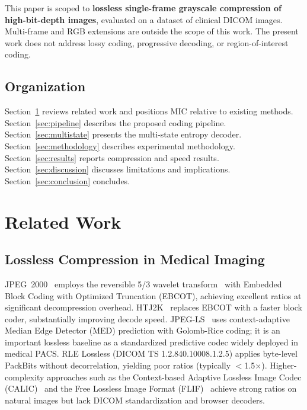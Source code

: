 \documentclass[journal]{IEEEtran}
\begin{document}
This paper is scoped to \textbf{lossless single-frame grayscale compression
of high-bit-depth images}, evaluated on a dataset of clinical DICOM images.
Multi-frame and RGB extensions are outside the scope of this work. The present
work does not address lossy coding, progressive decoding, or
region-of-interest coding.

\subsection{Organization}

Section~\ref{sec:related} reviews related work and positions MIC relative to
existing methods. Section~\ref{sec:pipeline} describes the proposed coding
pipeline. Section~\ref{sec:multistate} presents the multi-state entropy decoder.
Section~\ref{sec:methodology} describes experimental methodology.
Section~\ref{sec:results} reports compression and speed results.
Section~\ref{sec:discussion} discusses limitations and implications.
Section~\ref{sec:conclusion} concludes.

\section{Related Work}
\label{sec:related}

\subsection{Lossless Compression in Medical Imaging}

JPEG~2000~\cite{taubman2002} employs the reversible 5/3 wavelet
transform~\cite{legall1988,calderbank1998} with Embedded Block Coding with
Optimized Truncation (EBCOT), achieving excellent ratios at significant
decompression overhead. HTJ2K~\cite{htj2k2019,taubman2022}
replaces EBCOT with a faster block coder, substantially improving decode
speed. JPEG-LS~\cite{loco1,jpegls2} uses context-adaptive Median Edge
Detector (MED) prediction with Golomb-Rice coding; it is an important
lossless baseline as a standardized predictive codec widely deployed in
medical PACS. RLE Lossless (DICOM TS 1.2.840.10008.1.2.5) applies
byte-level PackBits without decorrelation, yielding poor ratios
(typically $<$1.5$\times$). Higher-complexity approaches such as the
Context-based Adaptive Lossless Image Codec (CALIC)~\cite{wu1997} and the
Free Lossless Image Format (FLIF)~\cite{sneyers2016} achieve strong ratios on
natural images but lack DICOM standardization and browser decoders.
\end{document}
